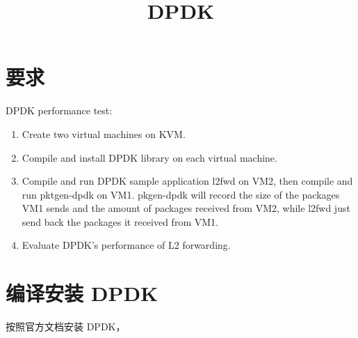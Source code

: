 

    \title{DPDK}
    \maketitle
    \tableofcontents
    \section{要求}

    DPDK performance test:

    \begin{enumerate}[(1)]
        \item Create two virtual machines on KVM.
        \item Compile and install DPDK library on each virtual machine.
        \item Compile and run DPDK sample application l2fwd on VM2, then compile and run pktgen-dpdk on VM1.  pkgen-dpdk will record the size of the packages VM1 sends and the amount of packages received from VM2,  while l2fwd just send back the packages it received from VM1.
        \item Evaluate DPDK's performance of L2 forwarding.
    \end{enumerate}

    \section{编译安装 DPDK}

    按照官方文档\cite{dpdk}安装 DPDK，

    

